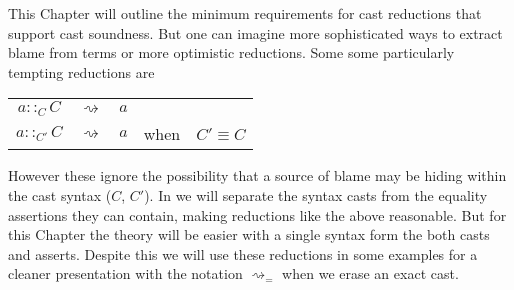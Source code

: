 This Chapter will outline the minimum requirements for cast reductions that support cast soundness.
But one can imagine more sophisticated ways to extract blame from terms or more optimistic reductions.
Some some particularly tempting reductions are

\begin{tabular}{ccccc}
$a::_{C}C$ & $\rightsquigarrow$ & $a$ &  & \tabularnewline
$a::_{C'}C$ & $\rightsquigarrow$ & $a$ & when & $C'\equiv C$\tabularnewline
\end{tabular}

However these ignore the possibility that a source of blame may be hiding within the cast syntax ($C$, $C'$).
In  we will separate the syntax casts from the equality assertions they can contain, making reductions like the above reasonable.
But for this Chapter the theory will be easier with a single syntax form the both casts and asserts.
Despite this we will use these reductions in some examples for a cleaner presentation with the notation $\rightsquigarrow_{=}$ when we erase an exact cast. %






